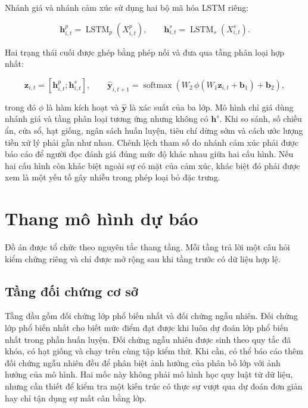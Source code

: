 Nhánh giá và nhánh cảm xúc sử dụng hai bộ mã hóa LSTM riêng:

\begin{equation}
  \mathbf{h}^{p}_{i,t}=\operatorname{LSTM}_{p}(X^{p}_{i,t}),
  \qquad
  \mathbf{h}^{s}_{i,t}=\operatorname{LSTM}_{s}(X^{s}_{i,t}).
  \label{eq:two-branch-encoders}
\end{equation}

Hai trạng thái cuối được ghép bằng phép nối và đưa qua tầng phân loại hợp nhất:

\begin{equation}
  \mathbf{z}_{i,t}=\left[\mathbf{h}^{p}_{i,t};\mathbf{h}^{s}_{i,t}\right],
  \qquad
  \hat{\mathbf{y}}_{i,t+1}=\operatorname{softmax}
  \left(W_2\,\phi(W_1\mathbf{z}_{i,t}+\mathbf{b}_1)+\mathbf{b}_2\right),
  \label{eq:fusion-classifier}
\end{equation}

trong đó $\phi$ là hàm kích hoạt và $\hat{\mathbf{y}}$ là xác suất của ba lớp. Mô
hình chỉ giá dùng nhánh giá và tầng phân loại tương ứng nhưng không có
$\mathbf{h}^{s}$. Khi so sánh, số chiều ẩn, cửa sổ, hạt giống, ngân sách huấn luyện,
tiêu chí dừng sớm và cách ước lượng tiền xử lý phải gần như nhau. Chênh lệch tham số
do nhánh cảm xúc phải được báo cáo để người đọc đánh giá đúng mức độ khác nhau giữa
hai cấu hình. Nếu hai cấu hình còn khác biệt ngoài sự có mặt của cảm xúc, khác biệt
đó phải được xem là một yếu tố gây nhiễu trong phép loại bỏ đặc trưng.

\section{Thang mô hình dự báo}
\label{sec:pp-mo-hinh}

Đồ án được tổ chức theo nguyên tắc thang tầng. Mỗi tầng trả lời một câu hỏi kiểm
chứng riêng và chỉ được mở rộng sau khi tầng trước có dữ liệu hợp lệ.

\subsection{Tầng đối chứng cơ sở}

Tầng đầu gồm đối chứng lớp phổ biến nhất và đối chứng ngẫu nhiên. Đối chứng lớp phổ
biến nhất cho biết mức điểm đạt được khi luôn dự đoán lớp phổ biến nhất trong phần
huấn luyện. Đối chứng ngẫu nhiên được sinh theo quy tắc đã khóa, có hạt giống và
chạy trên cùng tập kiểm thử. Khi cần, có thể báo cáo thêm đối chứng ngẫu nhiên đều
để phân biệt ảnh hưởng của phân bố lớp với ảnh hưởng của mô hình. Hai mốc này không
phải mô hình học quy luật từ dữ liệu, nhưng cần thiết để kiểm tra một kiến trúc có
thực sự vượt qua dự đoán đơn giản hay chỉ tận dụng sự mất cân bằng lớp.

